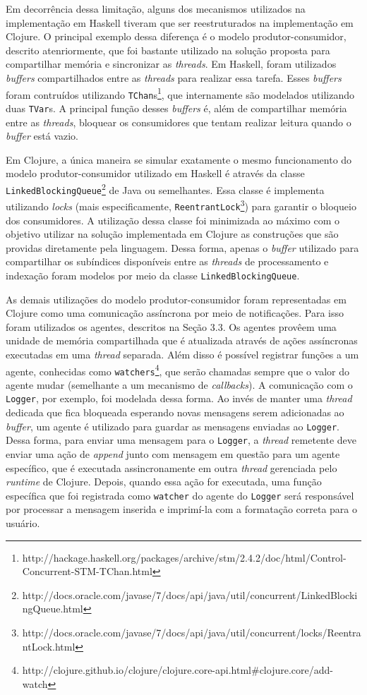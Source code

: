 Em decorrência dessa limitação, alguns dos mecanismos utilizados na implementação em Haskell tiveram que ser reestruturados na implementação em Clojure. O principal exemplo dessa diferença é o modelo produtor-consumidor, descrito atenriormente, que foi bastante utilizado na solução proposta para compartilhar memória e sincronizar as \emph{threads}. Em Haskell, foram utilizados \emph{buffers} compartilhados entre as \emph{threads} para realizar essa tarefa. Esses \emph{buffers} foram contruídos utilizando \verb|TChan|s\footnote{http://hackage.haskell.org/packages/archive/stm/2.4.2/doc/html/Control-Concurrent-STM-TChan.html}, que internamente são modelados utilizando duas \verb|TVar|s. A principal função desses \emph{buffers} é, além de compartilhar memória entre as \emph{threads}, bloquear os consumidores que tentam realizar leitura quando o \emph{buffer} está vazio.

Em Clojure, a única maneira se simular exatamente o mesmo funcionamento do modelo produtor-consumidor utilizado em Haskell é através da classe \verb|LinkedBlockingQueue|\footnote{http://docs.oracle.com/javase/7/docs/api/java/util/concurrent/LinkedBlockingQueue.html} de Java ou semelhantes. Essa classe é implementa utilizando \emph{locks} (mais especificamente, \verb|ReentrantLock|\footnote{http://docs.oracle.com/javase/7/docs/api/java/util/concurrent/locks/ReentrantLock.html}) para garantir o bloqueio dos consumidores. A utilização dessa classe foi minimizada ao máximo com o objetivo utilizar na solução implementada em Clojure as construções que são providas diretamente pela linguagem. Dessa forma, apenas o \emph{buffer} utilizado para compartilhar os subíndices disponíveis entre as \emph{threads} de processamento e indexação foram modelos por meio da classe \verb|LinkedBlockingQueue|.

As demais utilizações do modelo produtor-consumidor foram representadas em Clojure como uma comunicação assíncrona por meio de notificações. Para isso foram utilizados os agentes, descritos na Seção 3.3. Os agentes provêem uma unidade de memória compartilhada que é atualizada através de ações assíncronas executadas em uma \emph{thread} separada. Além disso é possível registrar funções a um agente, conhecidas como \verb|watchers|\footnote{http://clojure.github.io/clojure/clojure.core-api.html\#clojure.core/add-watch}, que serão chamadas sempre que o valor do agente mudar (semelhante a um mecanismo de \emph{callbacks}). A comunicação com o \verb|Logger|, por exemplo, foi modelada dessa forma. Ao invés de manter uma \emph{thread} dedicada que fica bloqueada esperando novas mensagens serem adicionadas ao \emph{buffer}, um agente é utilizado para guardar as mensagens enviadas ao \verb|Logger|. Dessa forma, para enviar uma mensagem para o \verb|Logger|, a \emph{thread} remetente deve enviar uma ação de \emph{append} junto com mensagem em questão para um agente específico, que é executada assincronamente em outra \emph{thread} gerenciada pelo \emph{runtime} de Clojure. Depois, quando essa ação for executada, uma função específica que foi registrada como \verb|watcher| do agente do \verb|Logger| será responsável por processar a mensagem inserida e imprimí-la com a formatação correta para o usuário.

